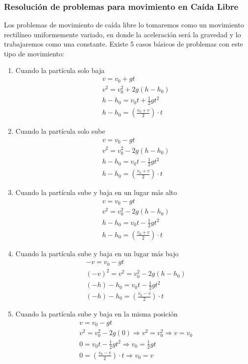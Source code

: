 \subsubsection*{Resolución de problemas para movimiento en Caída Libre}
Los problemas de movimiento de caída libre lo tomaremos como un movimiento rectilíneo uniformemente variado, en donde la aceleración será la gravedad y lo trabajaremos como una constante. Existe 5 casos básicos de problemas con este tipo de movimiento:
\begin{enumerate}
	\item Cuando la partícula solo baja
	\begin{align*}
		&v=v_0+gt \\
		&v^2=v_0^2+2g(h-h_0) \\
		&h-h_0=v_0t+\frac{1}{2}gt^2 \\
		&h-h_0=\left(\frac{v_0+v}{2}\right)\cdot t
	\end{align*}
	\item Cuando la partícula solo sube
	\begin{align*}
		&v=v_0-gt \\
		&v^2=v_0^2-2g(h-h_0) \\
		&h-h_0=v_0t-\frac{1}{2}gt^2 \\
		&h-h_0=\left(\frac{v_0+v}{2}\right)\cdot t
	\end{align*}
	\item Cuando la partícula sube y baja en un lugar más alto
	\begin{align*}
		&v=v_0-gt \\
		&v^2=v_0^2-2g(h-h_0) \\
		&h-h_0=v_0t-\frac{1}{2}gt^2 \\
		&h-h_0=\left(\frac{v_0+v}{2}\right)\cdot t
	\end{align*}
	\item Cuando la partícula sube y baja en un lugar más bajo
	\begin{align*}
		&-v=v_0-gt \\
		&(-v)^2=v^2=v_0^2-2g(h-h_0) \\
		&(-h)-h_0=v_0t-\frac{1}{2}gt^2 \\
		&(-h)-h_0=\left(\frac{v_0-v}{2}\right)\cdot t
	\end{align*}
	\item Cuando la partícula sube y baja en la misma posición
	\begin{align*}
		&v=v_0-gt \\
		&v^2=v_0^2-2g(0) \Rightarrow v^2=v_0^2 \Rightarrow v=v_0 \\
		&0=v_0t-\frac{1}{2}gt^2 \Rightarrow v_0=\frac{1}{2}gt \\
		&0=\left(\frac{v_0-v}{2}\right)\cdot t \Rightarrow v_0=v
	\end{align*}
\end{enumerate}
